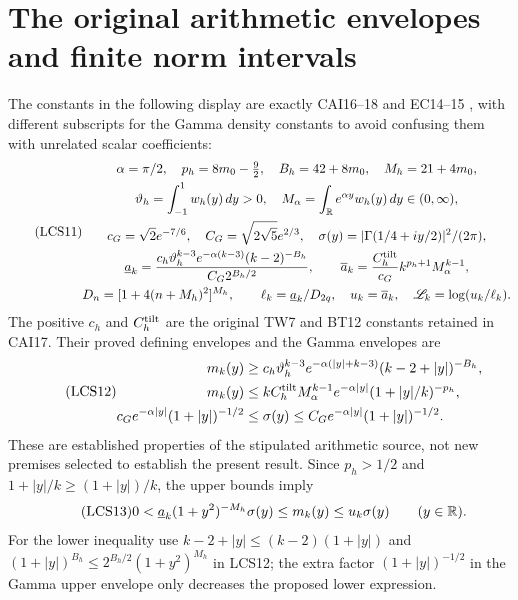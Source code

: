 \documentclass[11pt]{article}
\begin{document}
\section{The original arithmetic envelopes and finite norm intervals}

The constants in the following display are exactly CAI16--18 and
EC14--15 \cite{cai,ec}, with different subscripts for the Gamma
density constants to avoid confusing them with unrelated scalar
coefficients:
\begin{equation}\tag{LCS11}
\begin{gathered}
 \alpha=\pi/2,\quad p_h=8m_0-\tfrac92,\quad B_h=42+8m_0,
 \quad M_h=21+4m_0,\\
 \vartheta_h=\int_{-1}^1w_h(y)\,dy>0,\quad
 M_\alpha=\int_\mathbb R e^{\alpha y}w_h(y)\,dy\in(0,\infty),\\
 c_G=\sqrt2e^{-7/6},\quad C_G=\sqrt{2\sqrt5}e^{2/3},\quad
 \sigma(y)=|\Gamma(1/4+iy/2)|^2/(2\pi),\\
 \underline a_k=
 \frac{c_h\vartheta_h^{k-3}e^{-\alpha(k-3)}(k-2)^{-B_h}}
      {C_G2^{B_h/2}},\qquad
 \overline a_k=\frac{C_h^{\rm tilt}}{c_G}
       k^{p_h+1}M_\alpha^{k-1},\\
 D_n=[1+4(n+M_h)^2]^{M_h},\qquad
 \ell_k=\underline a_k/D_{2q},\quad
 u_k=\overline a_k,\quad \mathscr L_k=\log(u_k/\ell_k).
\end{gathered}
\end{equation}
The positive $c_h$ and $C_h^{\rm tilt}$ are the original TW7 and
BT12 constants retained in CAI17. Their proved defining envelopes
and the Gamma envelopes are
\begin{equation}\tag{LCS12}
\begin{aligned}
 m_k(y)&\ge c_h\vartheta_h^{k-3}
       e^{-\alpha(|y|+k-3)}(k-2+|y|)^{-B_h},\\
 m_k(y)&\le kC_h^{\rm tilt}M_\alpha^{k-1}
       e^{-\alpha|y|}(1+|y|/k)^{-p_h},\\
 c_Ge^{-\alpha|y|}(1+|y|)^{-1/2}
       &\le\sigma(y)\le C_Ge^{-\alpha|y|}(1+|y|)^{-1/2}.
\end{aligned}
\end{equation}
These are established properties of the stipulated arithmetic
source, not new premises selected to establish the present result.
Since $p_h>1/2$ and $1+|y|/k\ge(1+|y|)/k$, the upper bounds imply
\begin{equation}\tag{LCS13}
 0<\underline a_k(1+y^2)^{-M_h}\sigma(y)
       \le m_k(y)\le u_k\sigma(y)\qquad(y\in\mathbb R).
\end{equation}
For the lower inequality use
$k-2+|y|\le(k-2)(1+|y|)$ and
$(1+|y|)^{B_h}\le2^{B_h/2}(1+y^2)^{M_h}$ in LCS12;
the extra factor $(1+|y|)^{-1/2}$ in the Gamma upper envelope
only decreases the proposed lower expression.
\end{document}
